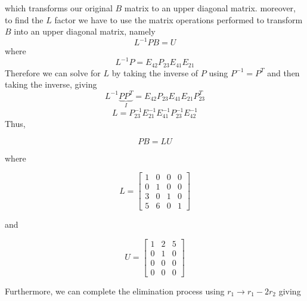 which transforms our original $B$ matrix to an upper diagonal matrix.
moreover, to find the $L$ factor we have to use the matrix operations
performed to transform $B$ into an upper diagonal matrix, namely
\begin{equation}
    L^{-1}PB = U
\end{equation}
where
\begin{equation}
    L^{-1}P = E_{42} P_{23} E_{41} E_{21}
\end{equation}
Therefore we can solve for $L$ by taking the inverse of $P$ using $P^{-1} =
P^{T}$ and then taking the inverse, giving
\begin{equation}
    L^{-1} \underbrace{P P^{T}}_{I} = E_{42} P_{23} E_{41} E_{21} P_{23}^{T} 
\end{equation}
\begin{equation}
    L = P^{-1}_{23} E^{-1}_{21} E^{-1}_{41} P^{-1}_{23} E^{-1}_{42}
\end{equation}
Thus,
\begin{mdframed}[style=MyFrame]
    \begin{equation}
        PB = LU
    \end{equation}
\end{mdframed}
where
\begin{mdframed}[style=MyFrame]
    \begin{equation}
        L = 
        \begin{bmatrix}
            1   &   0   &   0   &   0   \\
            0   &   1   &   0   &   0   \\
            3   &   0   &   1   &   0   \\
            5   &   6   &   0   &   1
        \end{bmatrix}
    \end{equation}
\end{mdframed}
and 
 \begin{mdframed}[style=MyFrame]
    \begin{equation}
        U = 
        \begin{bmatrix}
            1   &   2   &   5       \\
            0   &   1   &   0       \\
            0   &   0   &   0       \\
            0   &   0   &   0
        \end{bmatrix}
    \end{equation}
 \end{mdframed}
Furthermore, we can complete the elimination process using $r_{1} \rightarrow r_{1} - 2r_{2}$ giving 
